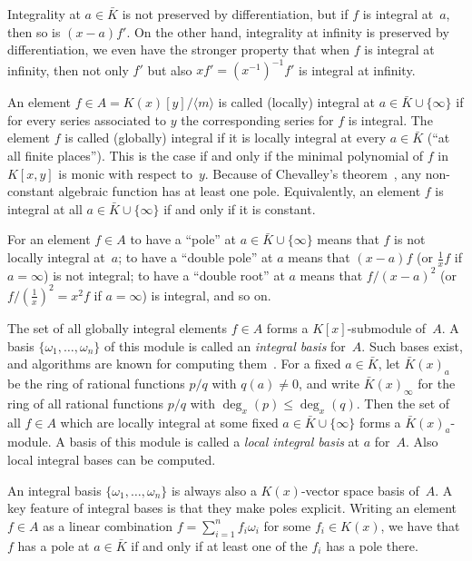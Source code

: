 \documentclass{sig-alternate-05-2015}
\begin{document}
Integrality at $a\in\bar K$ is not preserved by differentiation,
but if $f$ is integral at~$a$, then so is $(x-a)f'$. On the other hand,
integrality at infinity is preserved by differentiation, we even have the
stronger property that when $f$ is integral at infinity, then not only $f'$ but also $xf'=(x^{-1})^{-1}f'$ is
integral at infinity.

An element $f\in A=K(x)[y]/\langle m\rangle$
is called (locally) integral at $a\in\bar K\cup\{\infty\}$ if for every series
associated to $y$ the corresponding series for $f$ is integral.
The element $f$ is called (globally) integral if it is locally integral at every
$a\in\bar K$ (``at all finite places'').
This is the case if and only if the minimal polynomial of $f$ in $K[x,y]$ is monic
with respect to~$y$.
Because of Chevalley's theorem~\cite[page 9, Corollary 3]{Chevalley1951}, any
non-constant algebraic function has at least one pole. Equivalently, an element $f$ is
integral at all $a\in\bar K\cup\{\infty\}$ if and only if it is constant.

For an element $f\in A$ to have a ``pole'' at $a\in\bar K\cup\{\infty\}$ means
that $f$ is not locally integral at~$a$; to have a ``double pole'' at $a$ means
that $(x-a)f$ (or $\frac1xf$ if $a=\infty$) is not integral; to have a ``double
root'' at $a$ means that $f/(x-a)^2$ (or $f/(\frac1x)^2=x^2f$ if $a=\infty$) is integral,
and so on.

The set of all globally integral elements $f\in A$ forms a $K[x]$-submodule of~$A$.
A basis $\{\omega_1,\dots,\omega_n\}$ of this module is called an \emph{integral basis}
for~$A$. Such bases exist, and algorithms are known for computing them~\cite{trager84,Rybowicz:1991:ACI:120694.120715,vanHoeij94}.
For a fixed $a\in\bar K$, let $\bar K(x)_a$ be the ring of rational functions $p/q$
with $q(a)\neq0$, and write $\bar K(x)_\infty$ for the ring of all
rational functions $p/q$ with $\deg_x(p)\leq\deg_x(q)$.
Then the set of all $f\in A$ which are locally integral at some
fixed $a\in\bar K\cup\{\infty\}$ forms a $\bar K(x)_a$-module. A basis of this module is
called a \emph{local integral basis} at $a$ for~$A$. Also local integral bases can
be computed.

An integral basis $\{\omega_1,\dots,\omega_n\}$ is always also a $K(x)$-vector space
basis of~$A$. A key feature of integral bases is that they make poles explicit. Writing
an element $f\in A$ as a linear combination $f=\sum_{i=1}^n f_i\omega_i$ for some
$f_i\in K(x)$, we have that $f$ has a pole at $a\in\bar K$ if and only if at least one
of the $f_i$ has a pole there.
\end{document}
